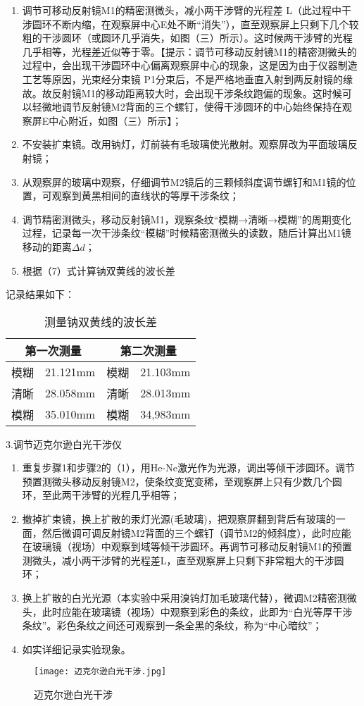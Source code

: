 \documentclass[dvipsnames, svgnames,a4paper,11pt]{article}
\begin{document}
\begin{enumerate}
	\item 调节可移动反射镜M1的精密测微头，减小两干涉臂的光程差 L（此过程中干涉圆环不断内缩，在观察屏中心E处不断“消失”），直至观察屏上只剩下几个较粗的干涉圆环（或圆环几乎消失，如图（三）所示）。这时候两干涉臂的光程几乎相等，光程差近似等于零。【提示：调节可移动反射镜M1的精密测微头的过程中，会出现干涉圆环中心偏离观察屏中心的现象，这是因为由于仪器制造工艺等原因，光束经分束镜
	P1分束后，不是严格地垂直入射到两反射镜的缘故。故反射镜M1的移动距离较大时，会出现干涉条纹跑偏的现象。这时候可以轻微地调节反射镜M2背面的三个螺钉，使得干涉圆环的中心始终保持在观察屏E中心附近，如图（三）所示】；
	\item 不安装扩束镜。改用钠灯，灯前装有毛玻璃使光散射。观察屏改为平面玻璃反射镜；
	\item 从观察屏的玻璃中观察，仔细调节M2镜后的三颗倾斜度调节螺钉和M1镜的位置，可观察到黄黑相间的直线状的等厚干涉条纹；
	\item 调节精密测微头，移动反射镜M1，观察条纹“模糊→清晰→模糊”的周期变化过程，记录每一次干涉条纹“模糊”时候精密测微头的读数，随后计算出M1镜移动的距离$\Delta d$；
	\item 根据（7）式计算钠双黄线的波长差
\end{enumerate}
记录结果如下：
\begin{table}[H]
	\centering
	\caption{测量钠双黄线的波长差}
	\begin{tabular}{cccc}
		\toprule
		\multicolumn{2}{c}{第一次测量}&\multicolumn{2}{c}{第二次测量}\\
		\midrule
		模糊&21.121mm&模糊&21.103mm\\
		清晰&28.058mm&清晰&28.013mm\\
		模糊&35.010mm&模糊&34,983mm\\
		\toprule
	\end{tabular}
\end{table}
3.调节迈克尔逊白光干涉仪
\begin{enumerate}
	\item 重复步骤1和步骤2的（1），用He-Ne激光作为光源，调出等倾干涉圆环。调节预置测微头移动反射镜M2，使条纹变宽变稀，至观察屏上只有少数几个圆环，至此两干涉臂的光程几乎相等；
	\item 撤掉扩束镜，换上扩散的汞灯光源(毛玻璃)，把观察屏翻到背后有玻璃的一面，然后微调可调反射镜M2背面的三个螺钉（调节M2的倾斜度），此时应能在玻璃镜（视场）中观察到域等倾干涉圆环。再调节可移动反射镜M1的预置测微头，减小两干涉臂的光程差L，直至观察屏上只剩下非常粗大的干涉圆环；
	\item 换上扩散的白光光源（本实验中采用溴钨灯加毛玻璃代替），微调M2精密测微头，此时应能在玻璃镜（视场）中观察到彩色的条纹，此即为“白光等厚干涉条纹”。彩色条纹之间还可观察到一条全黑的条纹，称为“中心暗纹”；
	\item 如实详细记录实验现象。
\end{enumerate}
\begin{figure}[H]
	\centering
	\texttt{[image: 迈克尔逊白光干涉.jpg]}
	\caption{迈克尔逊白光干涉}
\end{figure}
\end{document}
